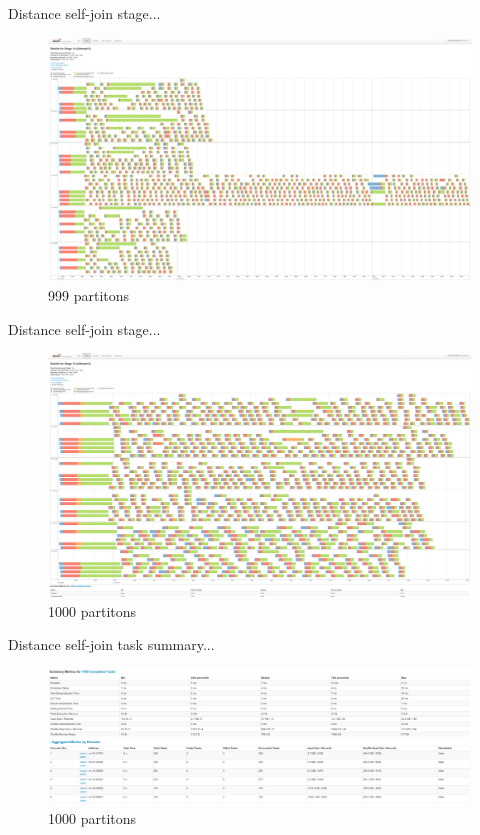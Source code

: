 \documentclass{beamer}
\begin{document}
\begin{frame}{Distance self-join stage...}
    \begin{figure}
        \includegraphics[width=\textwidth]{figures/P999S13}
        \caption{999 partitons}
    \end{figure}
\end{frame}
\begin{frame}{Distance self-join stage...}
    \begin{figure}
        \includegraphics[width=\textwidth]{figures/P1000S13}
        \caption{1000 partitons}
    \end{figure}
\end{frame}
\begin{frame}{Distance self-join task summary...}
    \begin{figure}
        \includegraphics[width=\textwidth]{figures/Summary1000}
        \caption{1000 partitons}
    \end{figure}
\end{frame}
\end{document}
